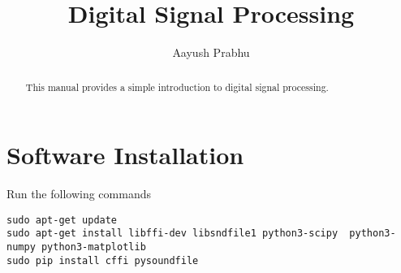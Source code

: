 \documentclass[journal,12pt,twocolumn]{IEEEtran}
\renewcommand\thesection{\arabic{section}}
\begin{document}
     \def\rightbox#1{\makebox[0in][r]{#1}}
     \def\centbox#1{\makebox[0in]{#1}}
     \def\topbox#1{\raisebox{-\baselineskip}[0in][0in]{#1}}
     \def\midbox#1{\raisebox{-0.5\baselineskip}[0in][0in]{#1}}
\vspace{3cm}
\title{ 
Digital Signal Processing
}
\author{ Aayush Prabhu%

}
\maketitle
\tableofcontents
\renewcommand{\thefigure}{\theenumi}
\renewcommand{\thetable}{\theenumi}
\bigskip
\begin{abstract}
This manual provides a simple introduction to digital signal processing.
\end{abstract}
\section{Software Installation}
Run the following commands
\begin{lstlisting}
sudo apt-get update
sudo apt-get install libffi-dev libsndfile1 python3-scipy  python3-numpy python3-matplotlib 
sudo pip install cffi pysoundfile 
\end{lstlisting}
\end{document}
